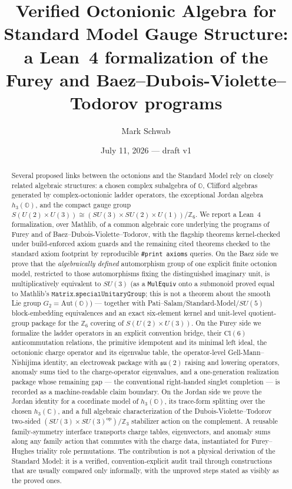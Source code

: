 \documentclass[11pt]{article}
\title{Verified Octonionic Algebra for Standard Model Gauge Structure:\\
a Lean~4 formalization of the Furey and
Baez--Dubois-Violette--Todorov programs}
\author{Mark Schwab}
\date{July 11, 2026 --- draft v1}
\newcommand{\C}{\mathbb{C}}
\newcommand{\OO}{\mathbb{O}}
\newcommand{\su}{\mathfrak{su}}
\newcommand{\leanname}[1]{\texttt{#1}}
\begin{document}
\maketitle

\begin{abstract}
Several proposed links between the octonions and the Standard Model rely on
closely related algebraic structures: a chosen complex subalgebra of
$\OO$, Clifford algebras generated by complex-octonionic ladder operators,
the exceptional Jordan algebra $h_3(\OO)$, and the compact gauge group
$S(U(2)\times U(3)) \cong (SU(3)\times SU(2)\times U(1))/\mathbb{Z}_6$.  We
report a Lean~4 formalization, over Mathlib, of a common algebraic core
underlying the programs of Furey and of
Baez--Dubois-Violette--Todorov, with the flagship theorems
kernel-checked under build-enforced axiom guards and the remaining cited
theorems checked to the standard axiom footprint by reproducible
\leanname{\#print axioms} queries.  On the Baez side we prove that the
\emph{algebraically defined} automorphism group of one explicit finite
octonion model, restricted to those automorphisms fixing the
distinguished imaginary unit, is multiplicatively
equivalent to $SU(3)$ (as a \leanname{MulEquiv} onto a submonoid proved
equal to Mathlib's
$\leanname{Matrix.specialUnitaryGroup}$; this is not a theorem about the
smooth Lie group $G_2=\mathrm{Aut}(\mathbb{O})$) --- together with
Pati--Salam/Standard-Model/$SU(5)$ block-embedding equivalences and an
exact six-element kernel and unit-level quotient-group package for the
$\mathbb{Z}_6$ covering of $S(U(2)\times U(3))$.  On the Furey side we
formalize the ladder operators in an explicit convention bridge, their
$\mathrm{Cl}(6)$ anticommutation relations, the primitive idempotent and
its minimal left ideal, the octonionic charge operator and its eigenvalue
table, the operator-level Gell-Mann--Nishijima identity, an electroweak
package with $\su(2)$ raising and lowering operators, anomaly sums tied to
the charge-operator eigenvalues, and a one-generation realization package
whose remaining gap --- the conventional right-handed singlet completion
--- is recorded as a machine-readable claim boundary.  On the Jordan side
we prove the Jordan identity for a coordinate model of $h_3(\OO)$, its
trace-form splitting over the chosen $h_3(\C)$, and a full algebraic
characterization of the Dubois-Violette--Todorov two-sided
$(SU(3)\times SU(3)^{\mathrm{op}})/\mathbb{Z}_3$ stabilizer action on the
complement.  A reusable family-symmetry interface transports charge
tables, eigenvectors, and anomaly sums along any family action that
commutes with the charge data, instantiated for Furey--Hughes triality
role permutations.  The contribution is not a physical derivation of the
Standard Model: it is a verified, convention-explicit audit trail through
constructions that are usually compared only informally, with the
unproved steps stated as visibly as the proved ones.
\end{abstract}
\end{document}
